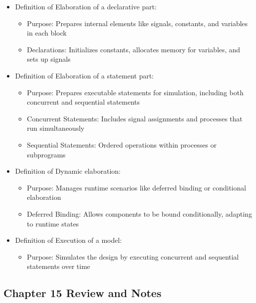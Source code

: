 \documentclass[a4paper,12pt]{article}
\begin{document}
	\begin{itemize}
		\item Definition of Elaboration of a declarative part:
		\begin{itemize}
			\item Purpose: Prepares internal elements like signals, constants, and variables in each block
			\item Declarations: Initializes constants, allocates memory for variables, and sets up signals
		\end{itemize}
	\end{itemize}
	
	\begin{itemize}
		\item Definition of Elaboration of a statement part:
		\begin{itemize}
			\item Purpose: Prepares executable statements for simulation, including both concurrent and sequential statements
			\item Concurrent Statements: Includes signal assignments and processes that run simultaneously
			\item Sequential Statements: Ordered operations within processes or subprograms
		\end{itemize}
	\end{itemize}
	
	\begin{itemize}
		\item Definition of Dynamic elaboration:
		\begin{itemize}
			\item Purpose: Manages runtime scenarios like deferred binding or conditional elaboration
			\item Deferred Binding: Allows components to be bound conditionally, adapting to runtime states
		\end{itemize}
	\end{itemize}
	
	\begin{itemize}
		\item Definition of Execution of a model:
		\begin{itemize}
			\item Purpose: Simulates the design by executing concurrent and sequential statements over time
		\end{itemize}
	\end{itemize}
	
	
	
	\subsection*{Chapter 15 Review and Notes}
	
\end{document}
